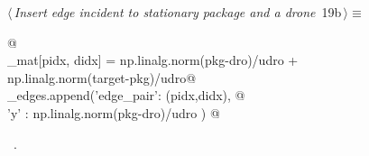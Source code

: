 \documentclass[10pt, english, oneside]{report}
\begin{document}
\begin{flushleft} \small
\begin{minipage}{\linewidth}\label{scrap18}\raggedright\small
{} $\langle\,${\itshape Insert edge incident to stationary package and a drone}\nobreak\ {\footnotesize {19b}}$\,\rangle\equiv$
\vspace{-1ex}
\begin{list}{}{} \item
\mbox{}\verb@   @\\
\mbox{}\verb@G_mat[pidx, didx] = np.linalg.norm(pkg-dro)/udro +\@\\
\mbox{}\verb@                    np.linalg.norm(target-pkg)/udro@\\
\mbox{}\verb@lbend_edges.append({'edge_pair': (pidx,didx), @\\
\mbox{}\verb@                    'y'        : np.linalg.norm(pkg-dro)/udro }) @\\
\mbox{}\verb@@{\NWsep}
\end{list}
\vspace{-1.5ex}
\footnotesize
\begin{list}{}{\setlength{\itemsep}{-\parsep}\setlength{\itemindent}{-\leftmargin}}
\item \NWtxtMacroRefIn\ .

\item{}
\end{list}
\end{minipage}\vspace{4ex}
\end{flushleft}
\end{document}
